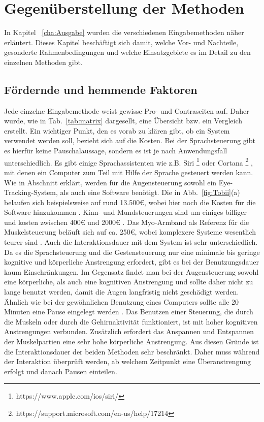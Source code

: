 \chapter{Gegenüberstellung der Methoden}
\label{cha:Vergleich}

In Kapitel ~\ref{cha:Ausgabe} wurden die verschiedenen Eingabemethoden näher erläutert. Dieses Kapitel beschäftigt sich damit, welche Vor- und Nachteile, gesonderte Rahmenbedingungen und welche Einsatzgebiete es im Detail zu den einzelnen Methoden gibt.

\section{Fördernde und hemmende Faktoren}
%
Jede einzelne Eingabemethode weist gewisse Pro- und Contraseiten auf. Daher wurde, wie in Tab.~\ref{tab:matrix} dargesellt, eine Übersicht bzw. ein Vergleich erstellt.
\newline \newline
Ein wichtiger Punkt, den es vorab zu klären gibt, ob ein System verwendet werden soll, bezieht sich auf die Kosten. Bei der Sprachsteuerung gibt es hierfür keine Pauschalaussage, sondern es ist je nach Anwendungsfall unterschiedlich. Es gibt einige Sprachassistenten wie z.B. Siri%
\footnote{https://www.apple.com/ios/siri/}
%
 oder Cortana%
\footnote{https://support.microsoft.com/en-us/help/17214}
%
 , mit denen ein Computer zum Teil mit Hilfe der Sprache gesteuert werden kann. Wie in Abschnitt \label{cha:Augensteuerung} erklärt, werden für die Augensteuerung sowohl ein Eye-Tracking-System, als auch eine Software benötigt. Die in Abb.~\ref{fig:Tobii}(a) belaufen sich beispielsweise auf rund 13.500€, wobei hier noch die Kosten für die Software hinzukommen \cite{TobiiCosts}. Kinn- und Mundsteuerungen sind um einiges billiger und kosten zwischen 400€ und 2000€ \cite{SENSORY} \cite{INTEGRA}. Das Myo-Armband als Referenz für die Muskelsteuerung beläuft sich auf ca. 250€, wobei komplexere Systeme wesentlich teurer sind \cite{myoBand}. 
\newline \newline
Auch die Interaktionsdauer mit dem System ist sehr unterschiedlich. Da es die Sprachsteuerung und die Gestensteuerung nur eine minimale bis geringe kognitive und körperliche Anstrengung erfordert, gibt es bei der Benutzungsdauer kaum Einschränkungen. Im Gegensatz findet man bei der Augensteuerung sowohl eine körperliche, als auch eine kognitiven Anstrengung und sollte daher nicht zu lange benutzt werden, damit die Augen langfristig nicht geschädigt werden. Ähnlich wie bei der gewöhnlichen Benutzung eines Computers sollte alle 20 Minuten eine Pause eingelegt werden \cite{20Methode}. Das Benutzen einer Steuerung, die durch die Muskeln oder durch die Gehirnaktivität funktioniert, ist mit hoher kognitiven Anstrengungen verbunden. Zusätzlich erfordert das Anspannen und Entspannen der Muskelpartien eine sehr hohe körperliche Anstrengung. Aus diesen Gründe ist die Interaktionsdauer der beiden Methoden sehr beschränkt. Daher muss während der Interaktion überprüft werden, ab welchem Zeitpunkt eine Überanstrengung erfolgt und danach Pausen einteilen.

